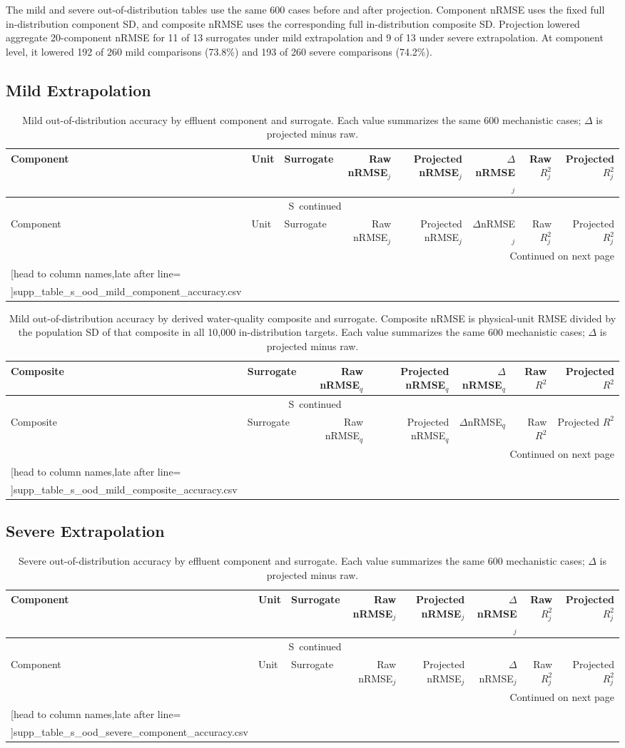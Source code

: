 \documentclass[a4paper,10pt]{article}
\newcommand{\csvrowsseven}[1]{%
  \csvreader[head to column names,late after line=\\]{#1}{}{\colA & \colB & \colC & \colD & \colE & \colF & \colG}}
\newcommand{\csvrowseight}[1]{%
  \csvreader[head to column names,late after line=\\]{#1}{}{\colA & \colB & \colC & \colD & \colE & \colF & \colG & \colH}}
\newcommand{\csvlongtable}[7]{%
  \begin{longtable}{#1}
  \caption{#2}\label{#3}\\
  \toprule
  #5 \\
  \midrule
  \endfirsthead
  \multicolumn{#4}{c}{\tablename\ \thetable\ continued}\\
  \toprule
  #5 \\
  \midrule
  \endhead
  \midrule\multicolumn{#4}{r}{Continued on next page}\\
  \endfoot
  \bottomrule
  \endlastfoot
  #7{#6}
  \end{longtable}%
}
\renewcommand{\thetable}{S\arabic{table}}
\begin{document}
The mild and severe out-of-distribution tables use the same 600 cases before and after projection. Component nRMSE uses the fixed full in-distribution component SD, and composite nRMSE uses the corresponding full in-distribution composite SD. Projection lowered aggregate 20-component nRMSE for 11 of 13 surrogates under mild extrapolation and 9 of 13 under severe extrapolation. At component level, it lowered 192 of 260 mild comparisons (73.8\%) and 193 of 260 severe comparisons (74.2\%).

\subsection{Mild Extrapolation}

\begingroup
\scriptsize
\setlength{\tabcolsep}{2.2pt}
\csvlongtable
  {llp{3.1cm}rrrrr}
  {Mild out-of-distribution accuracy by effluent component and surrogate. Each value summarizes the same 600 mechanistic cases; $\Delta$ is projected minus raw.}
  {tab:s_ood_mild_component_accuracy}
  {8}
  {Component & Unit & Surrogate & Raw nRMSE$_j$ & Projected nRMSE$_j$ & $\Delta$nRMSE$_j$ & Raw $R^2_j$ & Projected $R^2_j$}
  {supp_table_s_ood_mild_component_accuracy.csv}
  {\csvrowseight}
\endgroup

\clearpage
\begingroup
\scriptsize
\setlength{\tabcolsep}{3pt}
\csvlongtable
  {lp{3.1cm}rrrrr}
  {Mild out-of-distribution accuracy by derived water-quality composite and surrogate. Composite nRMSE is physical-unit RMSE divided by the population SD of that composite in all 10,000 in-distribution targets. Each value summarizes the same 600 mechanistic cases; $\Delta$ is projected minus raw.}
  {tab:s_ood_mild_composite_accuracy}
  {7}
  {Composite & Surrogate & Raw nRMSE$_q$ & Projected nRMSE$_q$ & $\Delta$nRMSE$_q$ & Raw $R^2$ & Projected $R^2$}
  {supp_table_s_ood_mild_composite_accuracy.csv}
  {\csvrowsseven}
\endgroup

\subsection{Severe Extrapolation}

\begingroup
\scriptsize
\setlength{\tabcolsep}{2.2pt}
\csvlongtable
  {llp{3.1cm}rrrrr}
  {Severe out-of-distribution accuracy by effluent component and surrogate. Each value summarizes the same 600 mechanistic cases; $\Delta$ is projected minus raw.}
  {tab:s_ood_severe_component_accuracy}
  {8}
  {Component & Unit & Surrogate & Raw nRMSE$_j$ & Projected nRMSE$_j$ & $\Delta$nRMSE$_j$ & Raw $R^2_j$ & Projected $R^2_j$}
  {supp_table_s_ood_severe_component_accuracy.csv}
  {\csvrowseight}
\endgroup
\end{document}
